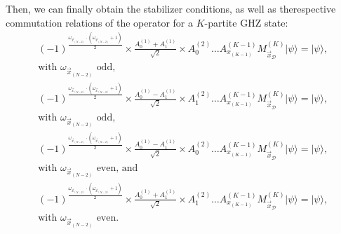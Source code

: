 \documentclass[12pt]{article}
\begin{document}
    \noindent Then, we can finally obtain the stabilizer conditions, as well as the\break respective commutation relations of the operator for a $K$-partite GHZ state:
    \begin{equation*}
        \begin{gathered}
           {(-1)}^{\frac{ {\omega}_{{\vec{x}}_{(N - 2)}} \cdot \left( {\omega}_{{\vec{x}}_{(N - 2)}} + 1 \right) }{2}} \times \frac{{A}_{0}^{(1)} + {A}_{1}^{(1)}}{\sqrt{2}} \times {A}_{0}^{(2)} \dots {A}_{{x}_{(K - 1)}}^{(K - 1)} {M}_{{\vec{x}}_{\mathcal{D}}}^{(K)} |\psi\rangle = |\psi\rangle \mathrm{\text{,}} \\
           \mathrm{\text{with }} {\omega}_{{\vec{x}_{(N - 2)}}} \mathrm{\text{ odd,}}
        \end{gathered}
    \end{equation*}
    \begin{equation*}
        \begin{gathered}
           {(-1)}^{\frac{ {\omega}_{{\vec{x}}_{(N - 2)}} \cdot \left( {\omega}_{{\vec{x}}_{(N - 2)}} + 1 \right) }{2}} \times \frac{{A}_{0}^{(1)} - {A}_{1}^{(1)}}{\sqrt{2}} \times {A}_{1}^{(2)} \dots {A}_{{x}_{(K - 1)}}^{(K - 1)} {M}_{{\vec{x}}_{\mathcal{D}}}^{(K)} |\psi\rangle = |\psi\rangle \mathrm{\text{,}} \\
           \mathrm{\text{with }} {\omega}_{{\vec{x}_{(N - 2)}}} \mathrm{\text{ odd,}}
        \end{gathered}
    \end{equation*}
    \begin{equation*}
        \begin{gathered}
           {(-1)}^{\frac{ {\omega}_{{\vec{x}}_{(N - 2)}} \cdot \left( {\omega}_{{\vec{x}}_{(N - 2)}} + 1 \right) }{2}} \times \frac{{A}_{0}^{(1)} - {A}_{1}^{(1)}}{\sqrt{2}} \times {A}_{0}^{(2)} \dots {A}_{{x}_{(K - 1)}}^{(K - 1)} {M}_{{\vec{x}}_{\mathcal{D}}}^{(K)} |\psi\rangle = |\psi\rangle \mathrm{\text{,}} \\
           \mathrm{\text{with }} {\omega}_{{\vec{x}_{(N - 2)}}} \mathrm{\text{ even, and}}
        \end{gathered}
    \end{equation*}
    \begin{equation*}
        \begin{gathered}
           {(-1)}^{\frac{ {\omega}_{{\vec{x}}_{(N - 2)}} \cdot \left( {\omega}_{{\vec{x}}_{(N - 2)}} + 1 \right) }{2}} \times \frac{{A}_{0}^{(1)} + {A}_{1}^{(1)}}{\sqrt{2}} \times {A}_{1}^{(2)} \dots {A}_{{x}_{(K - 1)}}^{(K - 1)} {M}_{{\vec{x}}_{\mathcal{D}}}^{(K)} |\psi\rangle = |\psi\rangle \mathrm{\text{,}} \\
           \mathrm{\text{with }} {\omega}_{{\vec{x}_{(N - 2)}}} \mathrm{\text{ even.}}
        \end{gathered}
    \end{equation*}
\end{document}

